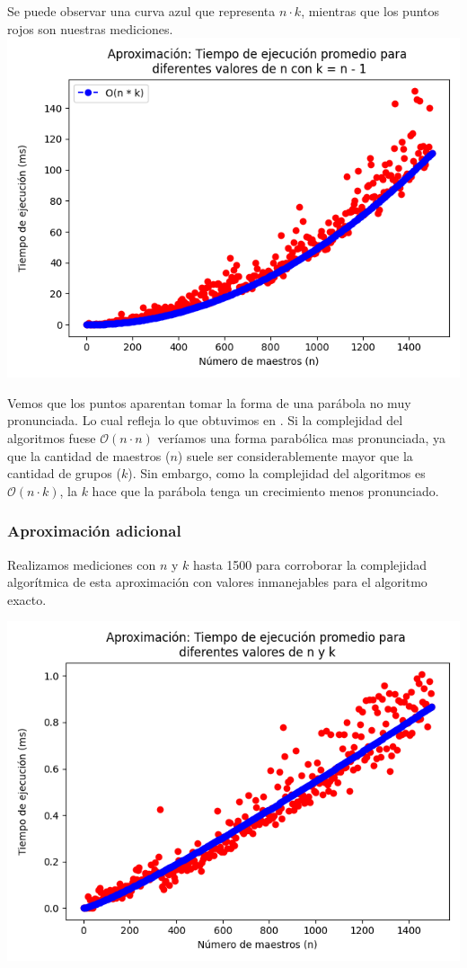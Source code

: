 \documentclass{article}
\begin{document}
Se puede observar una curva azul que representa $n \cdot k$, mientras que los puntos rojos son nuestras mediciones. 
\includegraphics[scale=0.60]{images/graficoAproxCatedra2.png}

Vemos que los puntos aparentan tomar la forma de una parábola no muy pronunciada. Lo cual refleja lo que obtuvimos en .
Si la complejidad del algoritmos fuese $\mathcal{O}(n \cdot n)$ veríamos una forma parabólica mas pronunciada, ya que la cantidad de maestros ($n$) suele ser considerablemente mayor que la cantidad de grupos ($k$). 
Sin embargo, como la complejidad del algoritmos es $\mathcal{O}(n \cdot k)$, la $k$ hace que la parábola tenga un crecimiento menos pronunciado.


\subsubsection{Aproximación adicional}

Realizamos mediciones con $n$ y $k$ hasta 1500 para corroborar la complejidad algorítmica de esta aproximación con valores inmanejables para el algoritmo exacto.

\includegraphics[scale=0.60]{images/graficoAproxAdicional.png}
\end{document}
